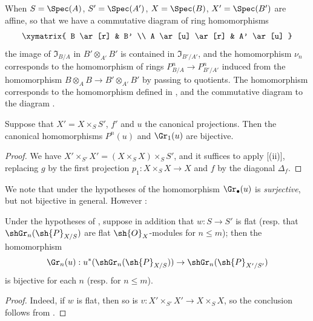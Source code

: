 \begin{env}[16.4.4]
\label{IV.16.4.4}
When $S = \Spec(A)$, $S' = \Spec(A')$, $X = \Spec(B)$, $X' = \Spec(B')$ are affine, so that we have a commutative diagram of ring homomorphisms
\[
  \xymatrix{
    B \ar[r] & B' \\
    A \ar[u] \ar[r] & A' \ar[u]
  }
\]
the image of $\mathfrak{I}_{B/A}$ in $B' \otimes_{A'} B'$ is contained in $\mathfrak{I}_{B'/A'}$, and the homomorphism $\nu_n$ corresponds to the homomorphism of rings $P_{B/A}^n \to P_{B'/A'}^n$ induced from the homomorphism $B \otimes_A B \to B' \otimes_{A'} B'$ by passing to quotients.
The homomorphism  corresponds to the homomorphism defined in , and the commutative diagram  to the diagram .
\end{env}

\begin{proposition}[16.4.5]
\label{IV.16.4.5}
Suppose that $X' = X \times_S S'$, $f'$ and $u$ the canonical projections.
Then the canonical homomorphisms $P^n(u)$  and $\Gr_1(u)$  are bijective.
\end{proposition}

\begin{proof}
We have $X' \times_{S'} X' = (X \times_S X) \times_S S'$, and it suffices to apply [(ii)], replacing $g$ by the first projection $p_1:X\times_S X \to X$ and $f$ by the diagonal $\Delta_f$.
\end{proof}

We note that under the hypotheses of  the homomorphism $\Gr_\bullet(u)$  is \emph{surjective}, but not bijective in general. 
However :

\begin{corollary}[16.4.6]
\label{IV.16.4.6}
Under the hypotheses of , suppose in addition that $w: S \to S'$ is flat (resp. that $\shGr_n(\sh{P}_{X/S})$ are flat $\sh{O}_X$-modules for $n \leq m$);
then the homomorphism
\[
  \Gr_n(u):u^*(\shGr_n(\sh{P}_{X/S})) \to \shGr_n(\sh{P}_{X'/S'})
\]
is bijective for each $n$ (resp. for $n \leq m$).
\end{corollary}

\begin{proof}
Indeed, if $w$ is flat, then so is $v: X' \times_{S'} X' \to X \times_S X$, so the conclusion follows from .
\end{proof}


